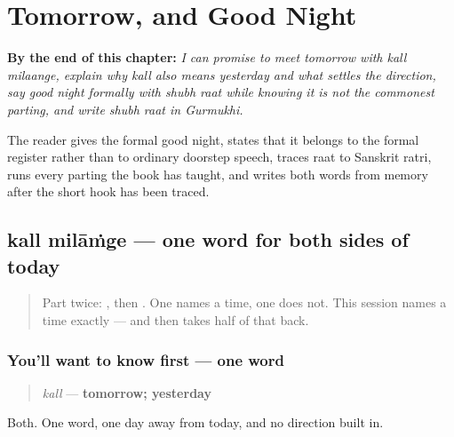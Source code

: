 
\chapter{Tomorrow, and Good Night}
\label{ch:pa-tomorrow-and-goodnight}

\begin{chapteropening}
\textbf{By the end of this chapter:} \emph{I can promise to meet tomorrow with kall milaange, explain why kall also means yesterday and what settles the direction, say good night formally with shubh raat while knowing it is not the commonest parting, and write shubh raat in Gurmukhi.}

The reader gives the formal good night, states that it belongs to the formal register rather than to ordinary doorstep speech, traces raat to Sanskrit ratri, runs every parting the book has taught, and writes both words from memory after the short hook has been traced.
\end{chapteropening}

\section[\texorpdfstring{\pa{ਕੱਲ੍ਹ} \pa{ਮਿਲਾਂਗੇ} (kall milāṁge)}{ਕੱਲ੍ਹ ਮਿਲਾਂਗੇ (kall milāṁge)}]{kall milāṁge — one word for both sides of today}

\label{lesson:PA-C36-kall-milaange}



\begin{quote}
Part twice: \textbf{ }, then \textbf{ }. One names a time, one does not. This session names a time exactly — and then takes half of that back.
\end{quote}

\subsection*{You'll want to know first — one word}
\begin{quote}
\emph{kall} — \textbf{tomorrow; yesterday}
\end{quote}

Both. One word, one day away from today, and no direction built in.

